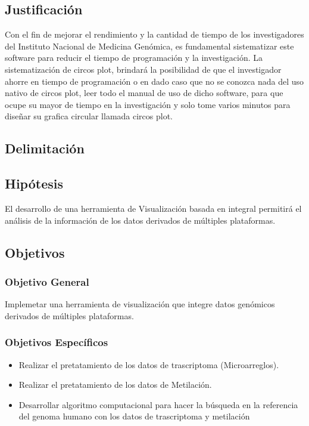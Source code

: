 \documentclass[12pt,letterpaper]{article}
\begin{document}
\subsection{Justificaci\'{o}n}
Con el fin de mejorar el rendimiento y la cantidad de tiempo de los investigadores del Instituto Nacional de Medicina Genómica, es fundamental sistematizar este software para reducir el tiempo de programación y la investigación.
La sistematización 	de circos plot, brindará la posibilidad de que el investigador ahorre en tiempo de programación o en dado caso que no se conozca nada del uso nativo de circos plot, leer todo el manual de uso de dicho software, para que ocupe su mayor de tiempo en la investigación y solo tome varios minutos para diseñar su grafica circular llamada circos plot.

\subsection{Delimitaci\'{o}n}


\subsection{Hip\'{o}tesis}
El desarrollo de una herramienta de Visualización basada en integral permitirá el análisis de la información de los datos derivados de múltiples plataformas.
\subsection{Objetivos}
\subsubsection{Objetivo General}
Implemetar una herramienta de visualización que integre datos genómicos derivados de múltiples plataformas.
\subsubsection{Objetivos Específicos}
\begin{itemize}
\item Realizar el pretatamiento de los datos de trascriptoma (Microarreglos).
\item Realizar el pretatamiento de los datos de Metilación.
\item Desarrollar algoritmo computacional para hacer la búsqueda en la referencia del genoma humano con los datos de trascriptoma y metilación
\end{itemize}
\end{document}
